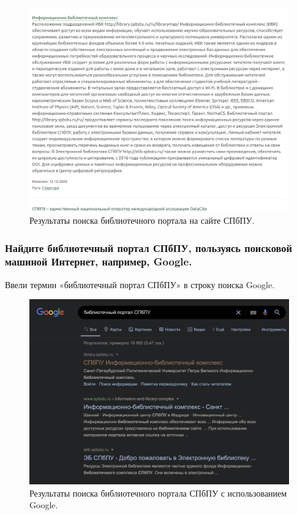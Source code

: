 \documentclass[14pt,a4paper,report]{report}
\begin{document}
\begin{figure}[h!]
\centering
\includegraphics[scale = 0.5]{114.png}
\caption{Результаты поиска библиотечного портала на сайте СПбПУ.}
\label{image:1}
\end{figure}

\clearpage

\subsubsection{Найдите библиотечный портал СПбПУ, пользуясь поисковой машиной Интернет, например, Google.}

Ввели термин «библиотечный портал СПбПУ» в строку поиска Google.

\begin{figure}[h!]
\centering
\includegraphics[scale = 0.5]{115.png}
\caption{Результаты поиска библиотечного портала СПбПУ с использованием Google.}
\label{image:1}
\end{figure}
\end{document}
